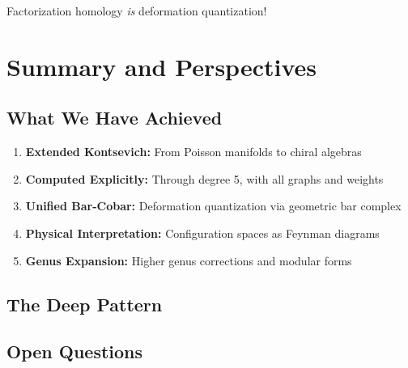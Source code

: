 Factorization homology \emph{is} deformation quantization!

\section{Summary and Perspectives}

\subsection{What We Have Achieved}

\begin{enumerate}
\item \textbf{Extended Kontsevich:} From Poisson manifolds to chiral algebras
\item \textbf{Computed Explicitly:} Through degree 5, with all graphs and weights
\item \textbf{Unified Bar-Cobar:} Deformation quantization via geometric bar complex
\item \textbf{Physical Interpretation:} Configuration spaces as Feynman diagrams
\item \textbf{Genus Expansion:} Higher genus corrections and modular forms
\end{enumerate}

\subsection{The Deep Pattern}

\begin{center}
\end{center}

\subsection{Open Questions}

